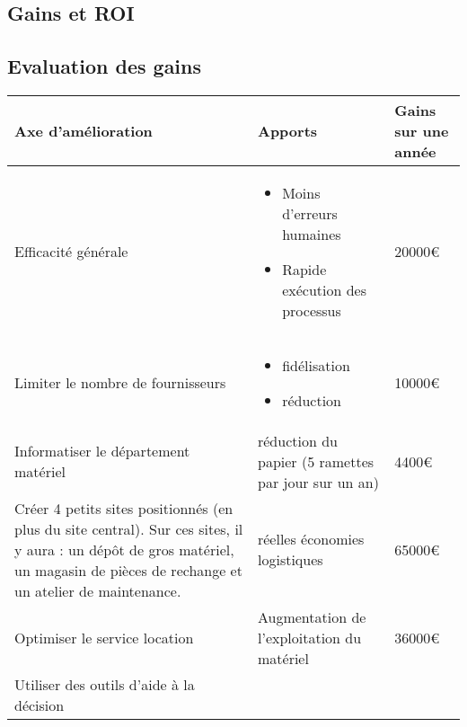 \begin{description}
\section{Gains et ROI}
\subsection{Evaluation des gains}

    \begin{tabular}{|p{7cm}|p{5cm}|p{2cm}|}    \hline
Axe d'amélioration & Apports & Gains sur une année\\ \hline

Efficacité générale
                                  & \begin{itemize}
                                      \item Moins d'erreurs humaines
                                      \item Rapide exécution des processus
                                     \end{itemize}
                                                          & 20000€  \\ \cline{1-2}
Limiter le nombre de fournisseurs 
                                  & \begin{itemize}
                                      \item fidélisation
                                      \item réduction
                                     \end{itemize}
                                                          & 10000€  \\ \cline{1-2}
Informatiser le département matériel 
                                  & réduction du papier (5 ramettes par jour sur un an)
                                                          & 4400€  \\ \cline{1-2}
Créer 4 petits sites positionnés (en plus du site central). Sur ces sites, il y aura : un dépôt de gros matériel, un magasin de
pièces de rechange et un atelier de maintenance. 
                                  & réelles économies logistiques
                                                          & 65000€  \\ \cline{1-2}
Optimiser le service location 
                                  & Augmentation de l'exploitation du matériel
                                                          &  36000€ \\ \cline{1-2}  
Utiliser des outils d'aide à la décision

\end{tabular}
\end{description}
